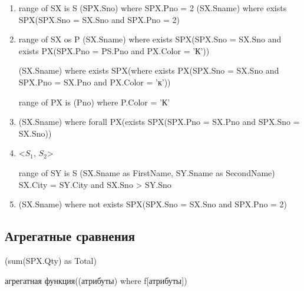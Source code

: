 \documentclass[a4paper, 14pt]{report}
\begin{document}
\begin{enumerate}
    \item range of SX is S (SPX.Sno) where SPX.Pno = 2 (SX.Sname) where exists SPX(SPX.Sno = SX.Sno and SPX.Pno = 2)
    \item range of SX os P (SX.Sname) where exists SPX(SPX.Sno = SX.Sno and exists PX(SPX.Pno = PS.Pno and PX.Color = 'К'))

        (SX.Sname) where exists SPX(where exists PX(SPX.Sno = SX.Sno and SPX.Pno = SX.Pno and PX.Color = 'к'))

        range of PX is (Pno) where P.Color = 'К'

    \item (SX.Sname) where forall PX(exists SPX(SPX.Pno = SX.Pno and SPX.Sno = SX.Sno))

    \item <$S_1$, $S_2$>

        range of SY is S (SX.Sname as FirstName, SY.Sname as SecondName) SX.City = SY.City and SX.Sno > SY.Sno

    \item (SX.Sname) where not exists SPX(SPX.Sno = SX.Sno and SPX.Pno = 2)
\end{enumerate}

\subsection{Агрегатные сравнения}

(sum(SPX.Qty) as Total)

агрегатная функция((атрибуты) where f[атрибуты])
\end{document}
